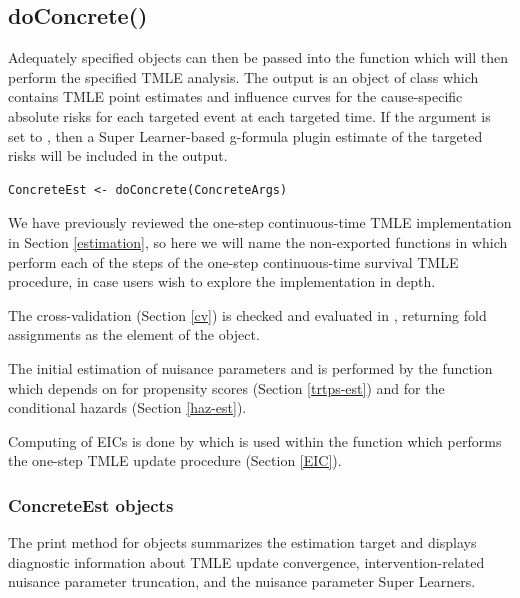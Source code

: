 \documentclass{report}
\newcommand{\1}{\ensuremath{\mathbf{1}}}
\begin{document}
\subsection{doConcrete()}
\label{doConcrete}
Adequately specified  objects can then be passed into the  function which will then perform the specified TMLE analysis. The output is an object of class  which contains TMLE point estimates and influence curves for the cause-specific absolute risks for each targeted event at each targeted time. If the  argument is set to , then a Super Learner-based g-formula plugin estimate of the targeted risks will be included in the output. 

\begin{lstlisting}
ConcreteEst <- doConcrete(ConcreteArgs)
\end{lstlisting}

We have previously reviewed the one-step continuous-time TMLE implementation in Section \ref{estimation}, so here we will name the non-exported functions in  which perform each of the steps of the one-step continuous-time survival TMLE procedure, in case users wish to explore the implementation in depth.

The cross-validation (Section \ref{cv}) is checked and evaluated in , returning fold assignments as the  element of the  object.

The initial estimation of nuisance parameters and is performed by the function  which depends on  for propensity scores (Section \ref{trtps-est}) and  for the conditional hazards (Section \ref{haz-est}).

Computing of EICs is done by  which is used within the  function which performs the one-step TMLE update procedure (Section \ref{EIC}).

\subsubsection{ConcreteEst objects}
\label{concreteest}
The print method for  objects summarizes the estimation target and displays diagnostic information about TMLE update convergence, intervention-related nuisance parameter truncation, and the nuisance parameter Super Learners.
\end{document}
